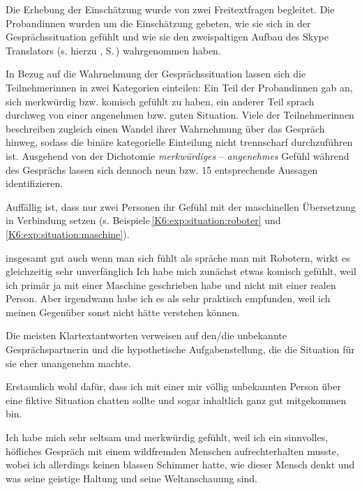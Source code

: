 Die Erhebung der Einschätzung wurde von zwei Freitextfragen begleitet. Die Proband{\textperiodcentered}innen wurden um die Einschätzung gebeten, wie sie sich in der Gesprächssituation gefühlt und wie sie den zweispaltigen Aufbau des Skype Translators (s. hierzu , S.\,\pageref{K3:fig:Ausschnitt-Ausgabe-MT-ST}) wahrgenommen haben.

In Bezug auf die Wahrnehmung der Gesprächssituation lassen sich die Teilnehmer{\textperiodcentered}innen in zwei Kategorien einteilen: Ein Teil der Proband{\textperiodcentered}innen gab an, sich merkwürdig bzw. komisch gefühlt zu haben, ein anderer Teil sprach durchweg von einer angenehmen bzw. guten Situation. Viele der Teilnehmer{\textperiodcentered}innen beschreiben zugleich einen Wandel ihrer Wahrnehmung über das Gespräch hinweg, sodass die binäre kategorielle Einteilung nicht trennscharf durchzuführen ist. Ausgehend von der Dichotomie \emph{merkwürdiges} – \emph{angenehmes} Gefühl während des Gesprächs lassen sich dennoch neun bzw. 15 entsprechende Aussagen identifizieren.

Auffällig ist, dass nur zwei Personen ihr Gefühl mit der maschinellen Übersetzung in Verbindung setzen (s. Beispiele\,\ref{K6:exp:situation:roboter} und \ref{K6:exp:situation:maschine}).\largerpage

\begin{example}
	\label{K6:exp:situation:roboter}
        insgesamt gut auch wenn man sich fühlt als spräche man mit Robotern, wirkt es gleichzeitig sehr unverfänglich
\ex
	\label{K6:exp:situation:maschine}
	Ich habe mich zunächst etwas komisch gefühlt, weil ich primär ja mit einer Maschine geschrieben habe und nicht mit einer realen Person. Aber irgendwann habe ich es als sehr praktisch empfunden, weil ich meinen Gegenüber sonst nicht hätte verstehen können.
\end{example}

Die meisten Klartextantworten verweisen auf den/die unbekannte Gesprächspartner{\textperiodcentered}in und die hypothetische Aufgabenstellung, die die Situation für sie eher unangenehm machte. 

\begin{example}
	\label{K6:exp:situation:inhaltlich}
	Erstaunlich wohl dafür, dass ich mit einer mir völlig unbekannten Person über eine fiktive Situation chatten sollte und sogar inhaltlich ganz gut mitgekommen bin.
\end{example}

\begin{example}
	\label{K6:exp:situation:schimmer}
	Ich habe mich sehr seltsam und merkwürdig gefühlt, weil ich ein sinnvolles, höfliches Gespräch mit einem wildfremden Menschen aufrechterhalten musste, wobei ich allerdings keinen blassen Schimmer hatte, wie dieser Mensch denkt und was seine geistige Haltung und seine Weltanschauung sind.
\end{example}

